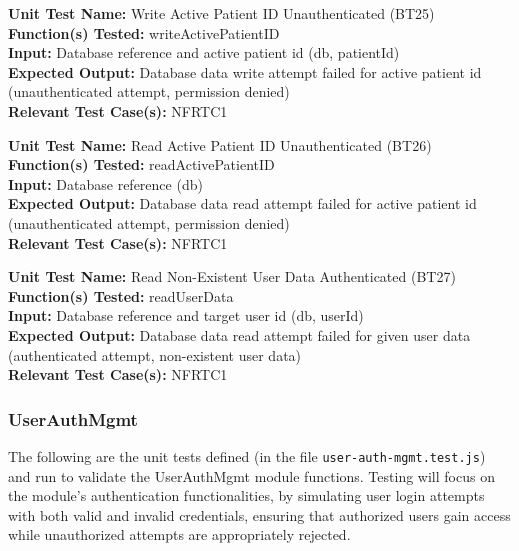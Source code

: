 \documentclass[12pt, titlepage]{article}
\begin{document}
\begin{mdframed}[linewidth=0.5mm]
  \textbf{Unit Test Name:} Write Active Patient ID Unauthenticated (BT25) \\
  \textbf{Function(s) Tested:} writeActivePatientID \\
  \textbf{Input:} Database reference and active patient id (db, patientId) \\
  \textbf{Expected Output:} Database data write attempt failed for active patient id (unauthenticated attempt, permission denied) \\
  \textbf{Relevant Test Case(s):} NFRTC1
\end{mdframed}

\begin{mdframed}[linewidth=0.5mm]
  \textbf{Unit Test Name:} Read Active Patient ID Unauthenticated (BT26) \\
  \textbf{Function(s) Tested:} readActivePatientID \\
  \textbf{Input:} Database reference (db) \\
  \textbf{Expected Output:} Database data read attempt failed for active patient id (unauthenticated attempt, permission denied) \\
  \textbf{Relevant Test Case(s):} NFRTC1
\end{mdframed}

\begin{mdframed}[linewidth=0.5mm]
  \textbf{Unit Test Name:} Read Non-Existent User Data Authenticated (BT27) \\
  \textbf{Function(s) Tested:} readUserData \\
  \textbf{Input:} Database reference and target user id (db, userId) \\
  \textbf{Expected Output:} Database data read attempt failed for given user data (authenticated attempt, non-existent user data) \\
  \textbf{Relevant Test Case(s):} NFRTC1
\end{mdframed}

\subsubsection{UserAuthMgmt}
The following are the unit tests defined (in the file \texttt{user-auth-mgmt.test.js}) and run to validate the UserAuthMgmt module functions. Testing will focus on the module's authentication functionalities, by simulating user login attempts with both valid and invalid credentials, ensuring that authorized users gain access while unauthorized attempts are appropriately rejected.
\end{document}

